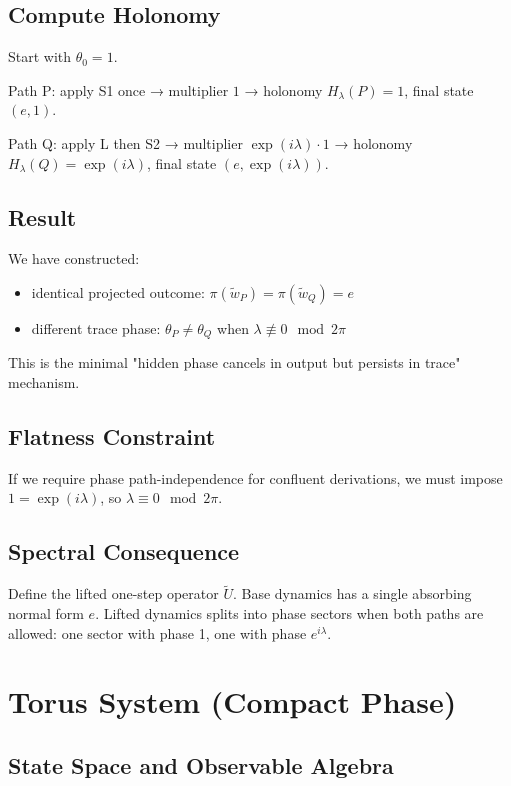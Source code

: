 \documentclass[12pt, oneside]{article}
\begin{document}
\subsection{Compute Holonomy}

Start with $\theta_0 = 1$.

Path P: apply S1 once → multiplier $1$ → holonomy $H_\lambda(P) = 1$, final state $(e,1)$.

Path Q: apply L then S2 → multiplier $\exp(i\lambda) \cdot 1$ → holonomy $H_\lambda(Q) = \exp(i\lambda)$, final state $(e,\exp(i\lambda))$.

\subsection{Result}

We have constructed:
\begin{itemize}
    \item identical projected outcome: $\pi(\widetilde{w}_P) = \pi(\widetilde{w}_Q) = e$
    \item different trace phase: $\theta_P \neq \theta_Q$ when $\lambda \not\equiv 0 \mod 2\pi$
\end{itemize}
This is the minimal "hidden phase cancels in output but persists in trace" mechanism.

\subsection{Flatness Constraint}

If we require phase path-independence for confluent derivations, we must impose $1 = \exp(i\lambda)$, so $\lambda \equiv 0 \mod 2\pi$.

\subsection{Spectral Consequence}

Define the lifted one-step operator $\widetilde{U}$. Base dynamics has a single absorbing normal form $e$. Lifted dynamics splits into phase sectors when both paths are allowed: one sector with phase 1, one with phase $e^{i\lambda}$.

\section{Torus System (Compact Phase)}

\subsection{State Space and Observable Algebra}
\end{document}
